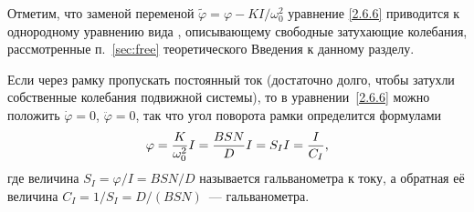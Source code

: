 Отметим, что заменой переменой $\tilde{\varphi} = \varphi - KI/\omega^2_0$ 
уравнение \eqref{2.6.6} приводится к однородному уравнению вида , 
описывающему свободные затухающие колебания, 
рассмотренные п.~\ref{sec:free} теоретического Введения к 
данному разделу.

Если через рамку пропускать постоянный ток (достаточно долго, чтобы затухли 
собственные колебания подвижной системы), то в уравнении~\eqref{2.6.6} можно положить 
$\dot{\varphi} = 0$, $\ddot{\varphi} = 0$, так что угол поворота рамки 
определится формулами
\begin{equation}
	\eqmark{2.6.8}
	\varphi = \frac{K}{\omega^2_0}I = \frac{BSN}{D}I = S_I I = \frac{I}{C_I},
\end{equation}
где величина $S_I = \varphi/I = BSN/D$ называется 
 гальванометра к току, а
обратная её величина $C_I = 1/S_I = D/(BSN)$~--- 
 гальванометра.

